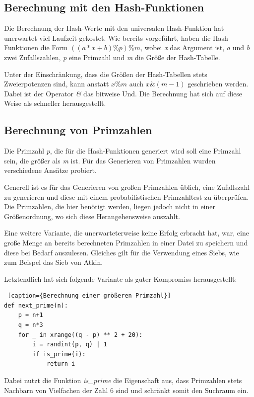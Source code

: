\subsection{Berechnung mit den Hash-Funktionen}
Die Berechnung der Hash-Werte mit den universalen Hash-Funktion hat unerwartet viel Laufzeit gekostet. Wie bereits vorgeführt, haben die Hash-Funktionen die Form \(((a*x+b)\%p)\%m\), wobei \textit{x} das Argument ist, \textit{a} und \textit{b} zwei Zufallszahlen, \textit{p} eine Primzahl und \textit{m} die Größe der Hash-Tabelle.

Unter der Einschränkung, dass die Größen der Hash-Tabellen stets Zweierpotenzen sind, kann anstatt \(x\%m\) auch \(x\&(m-1)\) geschrieben werden. Dabei ist der Operator \textit{\&} das bitweise Und. Die Berechnung hat sich auf diese Weise als schneller herausgestellt. 

\subsection{Berechnung von Primzahlen}
Die Primzahl \textit{p}, die für die Hash-Funktionen generiert wird soll eine Primzahl sein, die größer als \textit{m} ist. Für das Generieren von Primzahlen wurden verschiedene Ansätze probiert. 

Generell ist es für das Generieren von großen Primzahlen üblich, eine Zufallszahl zu generieren und diese mit einem probabilistischen Primzahltest zu überprüfen. Die Primzahlen, die hier benötigt werden, liegen jedoch nicht in einer Größenordnung, wo sich diese Herangehensweise auszahlt.

Eine weitere Variante, die unerwarteterweise keine Erfolg erbracht hat, war, eine große Menge an bereits berechneten Primzahlen in einer Datei zu speichern und diese bei Bedarf auszulesen. Gleiches gilt für die Verwendung eines Siebs, wie zum Beispel das Sieb von Atkin.

\newpage
Letztendlich hat sich folgende Variante als guter Kompromiss herausgestellt:
\begin{lstlisting} [caption={Berechnung einer größeren Primzahl}]
def next_prime(n):
    p = n+1
    q = n*3
    for _ in xrange((q - p) ** 2 + 20):
        i = randint(p, q) | 1
        if is_prime(i):
            return i               
\end{lstlisting}
Dabei nutzt die Funktion \textit{is\_prime} die Eigenschaft aus, dass Primzahlen stets Nachbarn von Vielfachen der Zahl 6 sind und schränkt somit den Suchraum ein.


